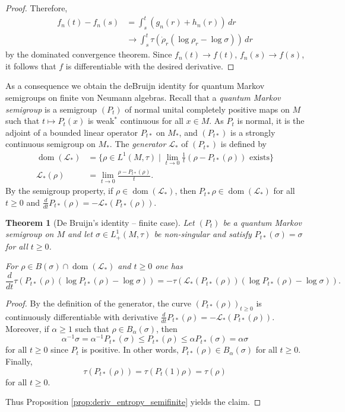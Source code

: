 \documentclass[12pt,a4paper]{amsart}
\newcommand{\1}{\mathds{1}}
\renewcommand{\L}{\mathcal L}
\newcommand{\dom}{\operatorname{dom}}
\theoremstyle{plain}
\newtheorem{theorem}[proposition]{Theorem}
\theoremstyle{definition}
\theoremstyle{remark}
\begin{document}
\begin{proof}
Therefore,
\begin{align*}
f_n(t)-f_n(s)&=\int_s^t (g_n(r)+h_n(r))\,dr\\
&\to \int_s^t \tau(\dot\rho_r(\log\rho_r-\log\sigma))\,dr
\end{align*}
by the dominated convergence theorem. Since $f_n(t)\to f(t)$, $f_n(s)\to f(s)$, it follows that $f$ is differentiable with the desired derivative.
\end{proof}

As a consequence we obtain the deBruijn identity for quantum Markov semigroups on finite von Neumann algebras. Recall that a \emph{quantum Markov semigroup} is a semigroup $(P_t)$ of normal unital completely positive maps on $M$ such that $t\mapsto P_t(x)$ is weak$^\ast$ continuous for all $x\in M$. As $P_t$ is normal, it is the adjoint of a bounded linear operator $P_{t\ast}$ on $M_\ast$, and $(P_{t\ast})$ is a strongly continuous semigroup on $M_\ast$. The \emph{generator} $\L_\ast$ of $(P_{t\ast})$ is defined by
\begin{align*}
    \dom(\L_\ast)&=\{\rho\in L^1(M,\tau)\mid \lim_{t\to 0}\frac 1 t(\rho-P_{t\ast}(\rho))\text{ exists}\}\\
    \L_\ast(\rho)&=\lim_{t\to 0}\frac{\rho-P_{t\ast}(\rho)}{t}.
\end{align*}
By the semigroup property, if $\rho\in \dom(\L_\ast)$, then $P_{t\ast}\rho\in \dom(\L_\ast)$ for all $t\geq 0$ and $\frac{d}{dt}P_{t\ast}(\rho)=-\L_\ast(P_{t\ast}(\rho))$.

\begin{theorem}[De Bruijn's identity -- finite case]\label{thm:DeBruijn_semifinite}
Let $(P_t)$ be a quantum Markov semigroup on $M$ and let $\sigma\in L^1_+(M,\tau)$ be non-singular and satisfy $P_{t\ast}(\sigma)=\sigma$ for all $t\geq 0$.

For $\rho\in B(\sigma)\cap \dom(\L_\ast)$ and $t\geq 0$ one has
\begin{equation*}
\frac{d}{dt}\tau(P_{t\ast}(\rho)(\log P_{t\ast}(\rho)-\log\sigma))=-\tau(\L_\ast(P_{t\ast}(\rho))(\log P_{t\ast}(\rho)-\log\sigma)).
\end{equation*}
\end{theorem}
\begin{proof}
By the definition of the generator, the curve $(P_{t\ast}(\rho))_{t\geq 0}$ is continuously differentiable with derivative $\frac{d}{dt}P_{t\ast}(\rho)=-\L_\ast(P_{t\ast}(\rho))$. Moreover, if $\alpha\geq 1$ such that $\rho\in B_\alpha(\sigma)$, then
\begin{equation*}
\alpha^{-1}\sigma=\alpha^{-1}P_{t\ast}(\sigma)\leq P_{t\ast}(\rho)\leq \alpha P_{t\ast}(\sigma)=\alpha\sigma
\end{equation*}
for all $t\geq 0$ since $P_t$ is positive. In other words, $P_{t\ast}(\rho)\in B_\alpha(\sigma)$ for all $t\geq 0$. Finally,
\begin{equation*}
\tau(P_{t\ast}(\rho))=\tau(P_t(1)\rho)=\tau(\rho)
\end{equation*}
for all $t\geq 0$.

Thus Proposition \ref{prop:deriv_entropy_semifinite} yields the claim.
\end{proof}
\end{document}
